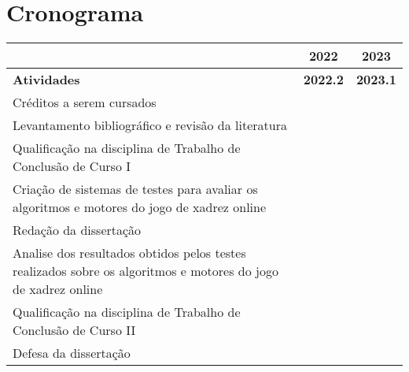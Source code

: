 \chapter{Cronograma}

\centering
\begin{tabular}{|m{12cm}|c|c|}

    \hline
                                                                                                                  & \textbf{2022}        & \textbf{2023}        \\
    \hline
    \textbf{Atividades}                                                                                           & \textbf{2022.2}      & \textbf{2023.1}      \\
    \hline
    Créditos a serem cursados                                                                                     & \cellcolor{gray!150} & \cellcolor{gray!150} \\
    \hline
    Levantamento bibliográfico e revisão da literatura                                                            & \cellcolor{gray!150} &                      \\
    \hline
    Qualificação na disciplina de Trabalho de Conclusão de Curso I                                                & \cellcolor{gray!150} &                      \\
    \hline
    Criação de sistemas de testes para avaliar os algoritmos e motores do jogo de xadrez online                   & \cellcolor{gray!150} & \cellcolor{gray!150} \\
    \hline
    Redação da dissertação                                                                                        & \cellcolor{gray!150} & \cellcolor{gray!150} \\
    \hline
    Analise dos resultados obtidos pelos testes realizados sobre os algoritmos e motores do jogo de xadrez online &                      & \cellcolor{gray!150} \\
    \hline
    Qualificação na disciplina de Trabalho de Conclusão de Curso II                                               &                      & \cellcolor{gray!150} \\
    \hline
    Defesa da dissertação                                                                                         &                      & \cellcolor{gray!150} \\
    \hline
\end{tabular}


